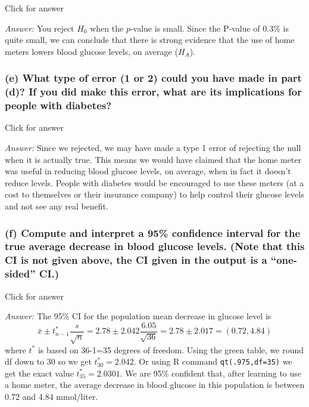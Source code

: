 \documentclass[
]{book}
\begin{document}
Click for answer

\emph{Answer:} You reject \(H_0\) when the \(p\)-value is small. Since the P-value of 0.3\% is quite small, we can conclude that there is strong evidence that the use of home meters lowers blood glucose levels, on average (\(H_A\)).

\hypertarget{e-what-type-of-error-1-or-2-could-you-have-made-in-part-d-if-you-did-make-this-error-what-are-its-implications-for-people-with-diabetes}{%
\subsubsection{(e) What type of error (1 or 2) could you have made in part (d)? If you did make this error, what are its implications for people with diabetes?}\label{e-what-type-of-error-1-or-2-could-you-have-made-in-part-d-if-you-did-make-this-error-what-are-its-implications-for-people-with-diabetes}}

Click for answer

\emph{Answer:} Since we rejected, we may have made a type 1 error of rejecting the null when it is actually true. This means we would have claimed that the home meter was useful in reducing blood glucose levels, on average, when in fact it doesn't reduce levels. People with diabetes would be encouraged to use these meters (at a cost to themselves or their insurance company) to help control their glucose levels and not see any real benefit.

\hypertarget{f-compute-and-interpret-a-95-confidence-interval-for-the-true-average-decrease-in-blood-glucose-levels.-note-that-this-ci-is-not-given-above-the-ci-given-in-the-output-is-a-one-sided-ci.}{%
\subsubsection{(f) Compute and interpret a 95\% confidence interval for the true average decrease in blood glucose levels. (Note that this CI is not given above, the CI given in the output is a ``one-sided'' CI.)}\label{f-compute-and-interpret-a-95-confidence-interval-for-the-true-average-decrease-in-blood-glucose-levels.-note-that-this-ci-is-not-given-above-the-ci-given-in-the-output-is-a-one-sided-ci.}}

Click for answer

\emph{Answer:} The 95\% CI for the population mean decrease in glucose level is
\[
\bar{x} \pm t^*_{n-1} \dfrac{s}{\sqrt{n}} = 2.78\pm 2.042 \dfrac{6.05}{\sqrt{36}} = 2.78 \pm 2.017 = (0.72, 4.84)
\]
where \(t^*\) is based on 36-1=35 degrees of freedom. Using the green table, we round df down to 30 so we get \(t^*_{30} = 2.042\). Or using R command \texttt{qt(.975,df=35)} we get the exact value \(t^*_{35}=2.0301\).
We are 95\% confident that, after learning to use a home meter, the average decrease in blood glucose in this population is between 0.72 and 4.84 mmol/liter.
\end{document}
